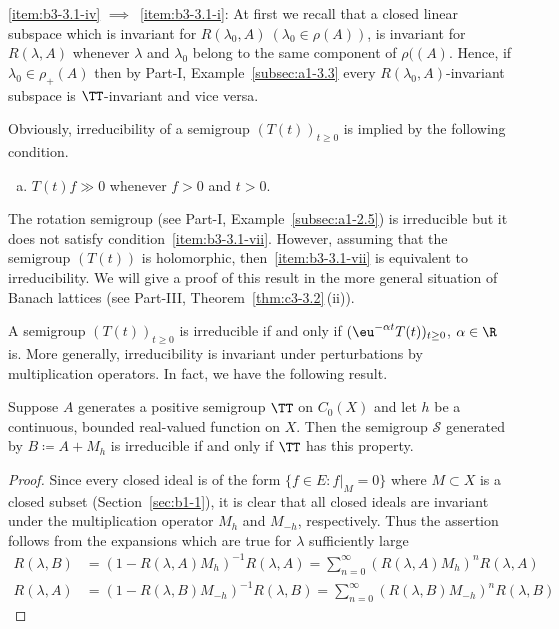 \ref{item:b3-3.1-iv} $\implies$~\ref{item:b3-3.1-i}: At first we recall that a closed linear subspace which is invariant for $R(\lambda_0,A)\ (\lambda_0 \in \rho(A))$, is invariant for $R(\lambda ,A)$
whenever $\lambda$ and $\lambda_0$ belong to the same component of\/ $\rho((A)$. 
Hence, if\/ $\lambda_0 \in \rho_{+}(A)$ then by Part-I, Example~\ref{subsec:a1-3.3} every $R(\lambda_0,A)$-invariant subspace is $\TT$-invariant and vice versa.
\begin{remark}\label{rem:b3-3.2}
	Obviously, irreducibility of a semigroup $(T(t))_{t\geq 0}$ is implied by the following condition.
\begin{enumerate}[(g)]	
\item\label{item:b3-3.1-vii}
$T(t)f \gg 0$ whenever $f > 0$ and $t > 0$.
\end{enumerate}
The rotation semigroup (see Part-I, Example~\ref{subsec:a1-2.5}) is irreducible but it does not satisfy condition~\ref{item:b3-3.1-vii}.
	However, assuming that the semigroup $(T(t))$ is holomorphic, then~\ref{item:b3-3.1-vii}
	is equivalent to irreducibility.
	We will give a proof of this result in the more general situation of Banach lattices (see Part-III, Theorem~\ref{thm:c3-3.2}\,(ii)).
\end{remark}
A semigroup $(T(t))_{t \ge 0}$ is irreducible if and only if\/ $(\eu^{-\alpha t}T(t))_{t \ge 0}$, $\alpha \in \R$  is. 
More generally, irreducibility is invariant under perturbations by multiplication operators. 
In fact, we have the following result. 
\begin{proposition}\label{prop:b3-3.3}
%
	Suppose $A$ generates a positive semigroup $\TT$ on $C_{0}(X)$ and let $h$ be a continuous, bounded real-valued function on $X$.
	Then the semigroup $\mathcal{S}$ generated by $B \coloneqq A + M_{h}$ is irreducible if and only if\/ $\TT$ has this property.
\end{proposition}
\begin{proof}
	Since every closed ideal is of the form $\{f \in E \colon f|_{M} = 0\}$ where $M \subset X$ is a closed subset (\cf Section~\ref{sec:b1-1}), it is clear that all closed ideals are invariant under the multiplication operator $M_{h}$ and $M_{-h}$, respectively.
	Thus the assertion follows from the expansions which are true for $\lambda$ sufficiently large
\begin{align*}
R(\lambda,B) &= (1 - R(\lambda,A)M_{h})^{-1}R(\lambda,A) 
	= \sum_{n=0}^{\infty} (R(\lambda,A)M_{h})^{n}R(\lambda,A) \\
R(\lambda,A) &= (1 - R(\lambda,B)M_{-h})^{-1}R(\lambda,B) = \sum_{n=0}^{\infty} (R(\lambda,B)M_{-h})^{n}R(\lambda,B)
\end{align*} 
\end{proof}
